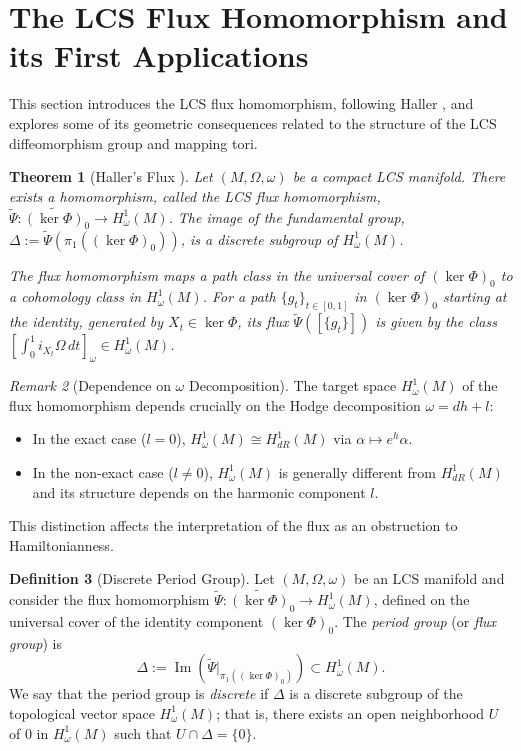 \documentclass[11pt,a4paper]{amsart}
\newtheorem{theorem}{Theorem}[section]
\theoremstyle{definition}
\newtheorem{definition}[theorem]{Definition}
\theoremstyle{remark}
\newtheorem{remark}[theorem]{Remark}
\newcommand{\ImMap}{\operatorname{Im}}
\begin{document}
	\section{The LCS Flux Homomorphism and its First Applications}
	
	This section introduces the LCS flux homomorphism, following Haller \cite{Haller2005}, and explores some of its geometric consequences related to the structure of the LCS diffeomorphism group and mapping tori.
	
	\begin{theorem}[Haller's Flux \cite{Haller2005}] \label{thm:haller_flux}
		Let $(M, \Omega, \omega)$ be a compact LCS manifold. There exists a homomorphism, called the \emph{LCS flux homomorphism}, $\widetilde{\Psi} : \widetilde{(\ker \Phi)}_0 \to H_\omega^1(M)$. The image of the fundamental group, $\Delta := \widetilde{\Psi}\left(\pi_1((\ker \Phi)_0)\right)$, is a discrete subgroup of $H_\omega^1(M)$.
		
		The flux homomorphism maps a path class in the universal cover of $(\ker \Phi)_0$ to a cohomology class in $H_\omega^1(M)$. For a path $\{g_t\}_{t \in [0,1]}$ in $(\ker \Phi)_0$ starting at the identity, generated by $X_t \in \ker \Phi$, its flux $\widetilde{\Psi}([\{g_t\}])$ is given by the class $\left[ \int_0^1 i_{X_t}\Omega \, dt \right]_\omega \in H_\omega^1(M)$.
	\end{theorem}
	
	\begin{remark}[Dependence on $\omega$ Decomposition]
		The target space $H_\omega^1(M)$ of the flux homomorphism depends crucially on the Hodge decomposition $\omega = dh + l$:
		\begin{itemize}
			\item In the exact case ($l=0$), $H_\omega^1(M) \cong H_{dR}^1(M)$ via $\alpha \mapsto e^h\alpha$.
			\item In the non-exact case ($l \neq 0$), $H_\omega^1(M)$ is generally different from $H_{dR}^1(M)$ and its structure depends on the harmonic component $l$.
		\end{itemize}
		This distinction affects the interpretation of the flux as an obstruction to Hamiltonianness.
	\end{remark}
	
	\begin{definition}[Discrete Period Group]
		Let $(M, \Omega, \omega)$ be an LCS manifold and consider the flux homomorphism $\widetilde{\Psi} : \widetilde{(\ker \Phi)}_0 \to H_\omega^1(M)$, defined on the universal cover of the identity component $(\ker \Phi)_0$. The \emph{period group} (or \emph{flux group}) is
		\[
		\Delta := \ImMap\!\left(\widetilde{\Psi}|_{\pi_1((\ker \Phi)_0)}\right) \subset H_\omega^1(M).
		\]
		We say that the period group is \emph{discrete} if $\Delta$ is a discrete subgroup of the topological vector space $H_\omega^1(M)$; that is, there exists an open neighborhood $U$ of $0$ in $H_\omega^1(M)$ such that $U \cap \Delta = \{0\}$.
	\end{definition}
	
\end{document}
